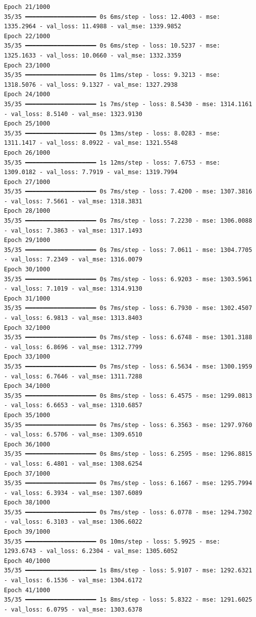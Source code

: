 \documentclass[
  letterpaper,
  DIV=11,
  numbers=noendperiod]{scrreprt}
\begin{document}
\begin{verbatim}
Epoch 21/1000
35/35 ━━━━━━━━━━━━━━━━━━━━ 0s 6ms/step - loss: 12.4003 - mse: 1335.2964 - val_loss: 11.4988 - val_mse: 1339.9852
Epoch 22/1000
35/35 ━━━━━━━━━━━━━━━━━━━━ 0s 6ms/step - loss: 10.5237 - mse: 1325.1633 - val_loss: 10.0660 - val_mse: 1332.3359
Epoch 23/1000
35/35 ━━━━━━━━━━━━━━━━━━━━ 0s 11ms/step - loss: 9.3213 - mse: 1318.5076 - val_loss: 9.1327 - val_mse: 1327.2938
Epoch 24/1000
35/35 ━━━━━━━━━━━━━━━━━━━━ 1s 7ms/step - loss: 8.5430 - mse: 1314.1161 - val_loss: 8.5140 - val_mse: 1323.9130
Epoch 25/1000
35/35 ━━━━━━━━━━━━━━━━━━━━ 0s 13ms/step - loss: 8.0283 - mse: 1311.1417 - val_loss: 8.0922 - val_mse: 1321.5548
Epoch 26/1000
35/35 ━━━━━━━━━━━━━━━━━━━━ 1s 12ms/step - loss: 7.6753 - mse: 1309.0182 - val_loss: 7.7919 - val_mse: 1319.7994
Epoch 27/1000
35/35 ━━━━━━━━━━━━━━━━━━━━ 0s 7ms/step - loss: 7.4200 - mse: 1307.3816 - val_loss: 7.5661 - val_mse: 1318.3831
Epoch 28/1000
35/35 ━━━━━━━━━━━━━━━━━━━━ 0s 7ms/step - loss: 7.2230 - mse: 1306.0088 - val_loss: 7.3863 - val_mse: 1317.1493
Epoch 29/1000
35/35 ━━━━━━━━━━━━━━━━━━━━ 0s 7ms/step - loss: 7.0611 - mse: 1304.7705 - val_loss: 7.2349 - val_mse: 1316.0079
Epoch 30/1000
35/35 ━━━━━━━━━━━━━━━━━━━━ 0s 7ms/step - loss: 6.9203 - mse: 1303.5961 - val_loss: 7.1019 - val_mse: 1314.9130
Epoch 31/1000
35/35 ━━━━━━━━━━━━━━━━━━━━ 0s 7ms/step - loss: 6.7930 - mse: 1302.4507 - val_loss: 6.9813 - val_mse: 1313.8403
Epoch 32/1000
35/35 ━━━━━━━━━━━━━━━━━━━━ 0s 7ms/step - loss: 6.6748 - mse: 1301.3188 - val_loss: 6.8696 - val_mse: 1312.7799
Epoch 33/1000
35/35 ━━━━━━━━━━━━━━━━━━━━ 0s 7ms/step - loss: 6.5634 - mse: 1300.1959 - val_loss: 6.7646 - val_mse: 1311.7288
Epoch 34/1000
35/35 ━━━━━━━━━━━━━━━━━━━━ 0s 8ms/step - loss: 6.4575 - mse: 1299.0813 - val_loss: 6.6653 - val_mse: 1310.6857
Epoch 35/1000
35/35 ━━━━━━━━━━━━━━━━━━━━ 0s 7ms/step - loss: 6.3563 - mse: 1297.9760 - val_loss: 6.5706 - val_mse: 1309.6510
Epoch 36/1000
35/35 ━━━━━━━━━━━━━━━━━━━━ 0s 8ms/step - loss: 6.2595 - mse: 1296.8815 - val_loss: 6.4801 - val_mse: 1308.6254
Epoch 37/1000
35/35 ━━━━━━━━━━━━━━━━━━━━ 0s 7ms/step - loss: 6.1667 - mse: 1295.7994 - val_loss: 6.3934 - val_mse: 1307.6089
Epoch 38/1000
35/35 ━━━━━━━━━━━━━━━━━━━━ 0s 7ms/step - loss: 6.0778 - mse: 1294.7302 - val_loss: 6.3103 - val_mse: 1306.6022
Epoch 39/1000
35/35 ━━━━━━━━━━━━━━━━━━━━ 0s 10ms/step - loss: 5.9925 - mse: 1293.6743 - val_loss: 6.2304 - val_mse: 1305.6052
Epoch 40/1000
35/35 ━━━━━━━━━━━━━━━━━━━━ 1s 8ms/step - loss: 5.9107 - mse: 1292.6321 - val_loss: 6.1536 - val_mse: 1304.6172
Epoch 41/1000
35/35 ━━━━━━━━━━━━━━━━━━━━ 1s 8ms/step - loss: 5.8322 - mse: 1291.6025 - val_loss: 6.0795 - val_mse: 1303.6378

\end{verbatim}
\end{document}
